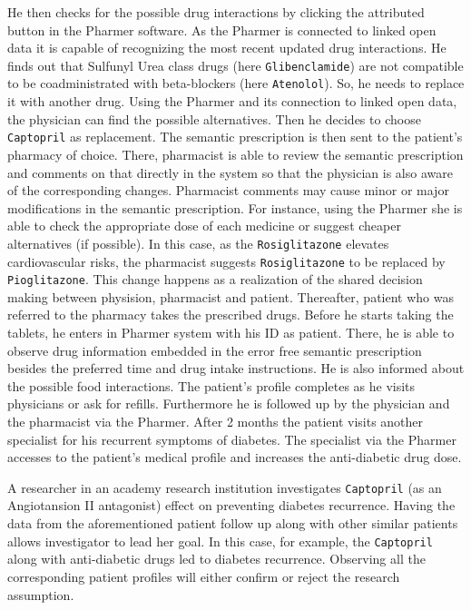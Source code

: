 \documentclass[conference]{IEEEtran}
\begin{document}
He then checks for the possible drug interactions by clicking the attributed button in the Pharmer software.
As the Pharmer is connected to linked open data it is capable of recognizing the most recent updated drug interactions.
He finds out that Sulfunyl Urea class drugs (here \texttt{Glibenclamide}) are not compatible to be coadministrated with beta-blockers (here \texttt{Atenolol}).
So, he needs to replace it with another drug.
Using the Pharmer and its connection to linked open data, the physician can find the possible alternatives.
Then he decides to choose \texttt{Captopril} as replacement.
The semantic prescription is then sent to the patient's pharmacy of choice.
There, pharmacist is able to review the semantic prescription and comments on that directly in the system so that the physician is also aware of the corresponding changes.
Pharmacist comments may cause minor or major modifications in the semantic prescription.
For instance, using the Pharmer she is able to check the appropriate dose of each medicine or suggest cheaper alternatives (if possible).
In this case, as the \texttt{Rosiglitazone} elevates cardiovascular risks, the pharmacist suggests \texttt{Rosiglitazone} to be replaced by \texttt{Pioglitazone}.
This change happens as a realization of the shared decision making between physision, pharmacist and patient.
Thereafter, patient who was referred to the pharmacy takes the prescribed drugs.
Before he starts taking the tablets, he enters in Pharmer system with his ID as patient.
There, he is able to observe drug information embedded in the error free semantic prescription besides the preferred time and drug intake instructions.
He is also informed about the possible food interactions.
The patient's profile completes as he visits physicians or ask for refills.
Furthermore he is followed up by the physician and the pharmacist via the Pharmer.
After 2 months the patient visits another specialist for his recurrent symptoms of diabetes.
The specialist via the Pharmer accesses to the patient's medical profile and increases the anti-diabetic drug dose.

A researcher in an academy research institution investigates \texttt{Captopril} (as an Angiotansion II antagonist) effect on preventing diabetes recurrence.
Having the data from the aforementioned patient follow up along with other similar patients allows investigator to lead her goal.
In this case, for example, the \texttt{Captopril} along with anti-diabetic drugs led to diabetes recurrence.
Observing all the corresponding patient profiles will either confirm or reject the research assumption.
\end{document}
